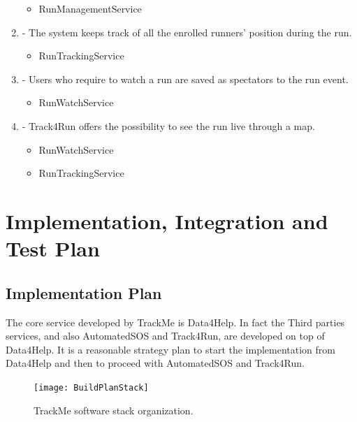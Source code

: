 \documentclass[a4paper]{article}
\begin{document}
\begin{enumerate}[label*=\bf{R.\arabic*}]
\begin{itemize}
\item RunManagementService
\end{itemize}

\item - The system keeps track of all the enrolled runners’ position during the run.

\begin{itemize}
\item RunTrackingService
\end{itemize}

\item - Users who require to watch a run are saved as spectators to the run event.

\begin{itemize}
\item RunWatchService
\end{itemize}

\item - Track4Run offers the possibility to see the run live through a map.

\begin{itemize}
\item RunWatchService
\item RunTrackingService
\end{itemize}

\end{enumerate}
\clearpage

\section{Implementation, Integration and Test Plan}
\subsection{Implementation Plan}
The core service developed by TrackMe is Data4Help. In fact the Third parties services, and also AutomatedSOS and Track4Run, are developed on top of Data4Help. 
It is a reasonable strategy plan to start the implementation from Data4Help and then to proceed with AutomatedSOS and Track4Run.

\begin{figure}[H]
    \centering
    \texttt{[image: BuildPlanStack]}
    \caption{TrackMe software stack organization.}
    \label{fig:my_label}
\end{figure}
\end{document}
